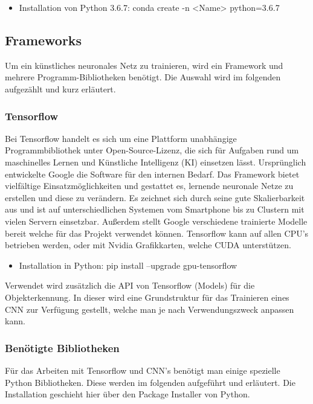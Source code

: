 \documentclass[a4paper,12pt,oneside]{article}
\begin{document}
  \begin{itemize}
	\item Installation von Python 3.6.7: conda create -n <Name> python=3.6.7
  \end{itemize}
  
  \subsection{Frameworks}
Um ein künstliches neuronales Netz zu trainieren, wird ein Framework und mehrere Programm-Bibliotheken benötigt. Die Auswahl wird im folgenden aufgezählt und kurz erläutert.
 
  \subsubsection{Tensorflow}
Bei Tensorflow \cite{google2018tens} handelt es sich um eine Plattform unabhängige Programmbibliothek unter Open-Source-Lizenz, die sich für Aufgaben rund um maschinelles Lernen und Künstliche Intelligenz (KI) einsetzen lässt. Ursprünglich entwickelte Google die Software für den internen Bedarf. Das Framework bietet vielfältige Einsatzmöglichkeiten und gestattet es, lernende neuronale Netze zu erstellen und diese zu verändern. Es zeichnet sich durch seine gute Skalierbarkeit aus und ist auf unterschiedlichen Systemen vom Smartphone bis zu Clustern mit vielen Servern einsetzbar. Außerdem stellt Google verschiedene trainierte Modelle bereit welche für das Projekt verwendet können. Tensorflow kann auf allen CPU's betrieben werden, oder mit Nvidia Grafikkarten, welche CUDA unterstützen.

  \begin{itemize}
\item Installation in Python: pip install --upgrade gpu-tensorflow
  \end{itemize}
  
Verwendet wird zusätzlich die API von Tensorflow (Models) für die Objekterkennung. In dieser wird eine Grundstruktur für das Trainieren eines CNN zur Verfügung gestellt, welche man je nach Verwendungszweck anpassen kann.
  
  \subsubsection{Benötigte Bibliotheken}
Für das Arbeiten mit Tensorflow und CNN's benötigt man einige spezielle Python Bibliotheken. Diese werden im folgenden aufgeführt und erläutert. Die Installation geschieht hier über den \glqq Package Installer \glqq von Python.
\\
 
\end{document}
